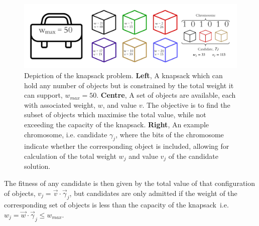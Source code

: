 \begin{figure}[t]
    \begin{center}
        \includegraphics[width=\textwidth]{theoretical_study/figures/knapsack_schematic.pdf}
    \end{center}
    \caption[Knapsack problem]{
        Depiction of the knapsack problem.
        \textbf{Left}, A knapsack which can hold any number of objects but is constrained by the total weight it can support, 
        $w_{max} = 50$. 
        \textbf{Centre}, A set of objects are available, each with associated weight, $w$, and value $v$. 
        The objective is to find the subset of objects which maximise the total value, 
        while not exceeding the capacity of the knapsack. 
        \textbf{Right}, An example chromosome, i.e. candidate $\gamma_j$, where the bits of the chromosome indicate 
            whether the corresponding object is included, allowing for calculation of the total weight $w_j$ and value $v_j$ of 
            the candidate solution. 
    }

\end{figure}

\par
The fitness of any candidate is then given by the total value of that configuration of objects, $v_j = \vec{v} \cdot \vec{\gamma}_j$, 
    but candidates are only admitted if the weight of the corresponding set of objects 
    is less than the capacity of the knapsack\footnotemark \, i.e. $w_j = \vec{w} \cdot \vec{\gamma}_j \leq w_{max}$. 
\par 

